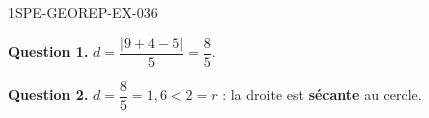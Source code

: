 \begin{corrige}{1SPE-GEOREP-EX-036}

\textbf{Question 1.} $d = \dfrac{|9 + 4 - 5|}{5} = \dfrac{8}{5}$.

\textbf{Question 2.} $d = \dfrac{8}{5} = 1{,}6 < 2 = r$ : la droite est \textbf{sécante} au cercle.

\end{corrige}
